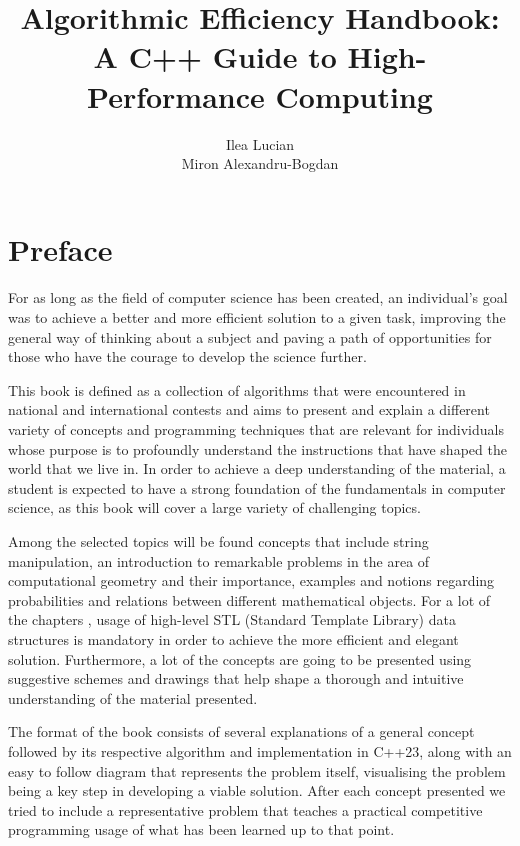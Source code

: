 \documentclass[letterpaper]{article}
\title{%
  Algorithmic Efficiency Handbook: \\
  \large A C++ Guide to High-Performance Computing \\
    }
\author{Ilea Lucian \\ Miron Alexandru-Bogdan}
\date{}
\begin{document}
\maketitle

\newpage

\tableofcontents


\newpage

\section{Preface}

\paragraph{}

For as long as the field of computer science has been created, an individual's goal was to achieve a better and more efficient solution to a given task, improving the general way of thinking about a subject and paving a path of opportunities for those who have the courage to develop the science further.

This book is defined as a collection of algorithms that were encountered in national and international contests and aims to present and explain a different variety of concepts and programming techniques that are relevant for individuals whose purpose is to profoundly understand the instructions that have shaped the world that we live in. In order to achieve a deep understanding of the material, a student is expected to have a strong foundation of the fundamentals in computer science, as this book will cover a large variety of challenging topics. 

Among the selected topics will be found concepts that include string manipulation, an introduction to remarkable problems in the area of computational geometry and their importance, examples and notions regarding probabilities and relations between different mathematical objects. For a lot of the chapters , usage of high-level STL (Standard Template Library) data structures is mandatory in order to achieve the more efficient and elegant solution. Furthermore, a lot of the concepts are going to be presented using suggestive schemes and drawings that help shape a thorough and intuitive understanding of the material presented.

The format of the book consists of several explanations of a general concept followed by its respective algorithm and implementation in C++23, along with an easy to follow diagram that represents the problem itself, visualising the problem being a key step in developing a viable solution. After each concept presented we tried to include a representative problem that teaches a practical competitive programming usage of what has been learned up to that point.
\end{document}
